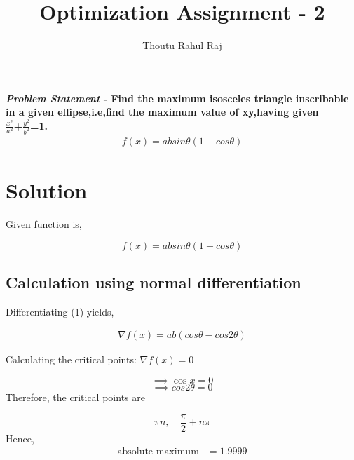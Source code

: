 \documentclass[10pt,twocolumn]{article}
\title{\textbf{Optimization Assignment - 2}}
\author{Thoutu Rahul Raj}
\begin{document}
\maketitle
\paragraph{\textit{Problem Statement} - Find the maximum isosceles triangle inscribable in a given ellipse,i.e,find the maximum value of xy,having given\\
\large{$ \frac{x^2}{a^2}$+$\frac{y^2}{b^2}$=1.}
\begin{align*}
f(x) = absin\theta(1-cos\theta)
\end{align*}} 

\section{Solution}
\begin{flushleft}
Given function is,\\
\end{flushleft}
\begin{equation}
    f(x)=absin\theta(1-cos\theta)
\end{equation}
\subsection{Calculation using normal differentiation}
\begin{flushleft}
Differentiating (1) yields,
\end{flushleft}
\begin{align}
\nabla f(x) = ab(cos\theta-cos2\theta)
\end{align}

\noindent Calculating the critical points:
$ \nabla f(x) = 0 $

\begin{equation}
\implies \cos{x} = 0 
\end{equation}
\begin{equation}
\implies cos2\theta = 0
\end{equation}
Therefore, the critical points are 

\begin{equation}
{\pi}n,\quad\frac{\pi}{2}+n\pi
\end{equation}
Hence, 
\begin{align}
\text{absolute maximum} & =  1.9999\\
\end{align}
\end{document}
